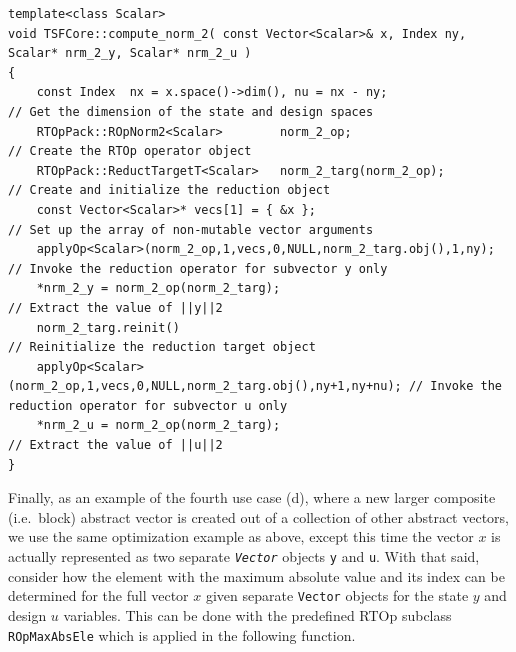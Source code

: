{\tiny\begin{verbatim}
template<class Scalar>
void TSFCore::compute_norm_2( const Vector<Scalar>& x, Index ny, Scalar* nrm_2_y, Scalar* nrm_2_u )
{
    const Index  nx = x.space()->dim(), nu = nx - ny;                      // Get the dimension of the state and design spaces
    RTOpPack::ROpNorm2<Scalar>        norm_2_op;                           // Create the RTOp operator object
    RTOpPack::ReductTargetT<Scalar>   norm_2_targ(norm_2_op);              // Create and initialize the reduction object
    const Vector<Scalar>* vecs[1] = { &x };                                // Set up the array of non-mutable vector arguments
    applyOp<Scalar>(norm_2_op,1,vecs,0,NULL,norm_2_targ.obj(),1,ny);       // Invoke the reduction operator for subvector y only
    *nrm_2_y = norm_2_op(norm_2_targ);                                     // Extract the value of ||y||2
    norm_2_targ.reinit()                                                   // Reinitialize the reduction target object
    applyOp<Scalar>(norm_2_op,1,vecs,0,NULL,norm_2_targ.obj(),ny+1,ny+nu); // Invoke the reduction operator for subvector u only
    *nrm_2_u = norm_2_op(norm_2_targ);                                     // Extract the value of ||u||2
}
\end{verbatim}}

Finally, as an example of the fourth use case (d), where a new larger
composite (i.e.~block) abstract vector is created out of a collection
of other abstract vectors, we use the same optimization example as
above, except this time the vector $x$ is actually represented as two
separate \texttt{\textit{Vector}} objects \texttt{y} and \texttt{u}.
With that said, consider how the element with the maximum absolute
value and its index can be determined for the full vector $x$ given
separate \texttt{Vector} objects for the state $y$ and design $u$
variables.  This can be done with the predefined RTOp subclass
\texttt{ROpMax\-AbsEle} which is applied in the following
function.

